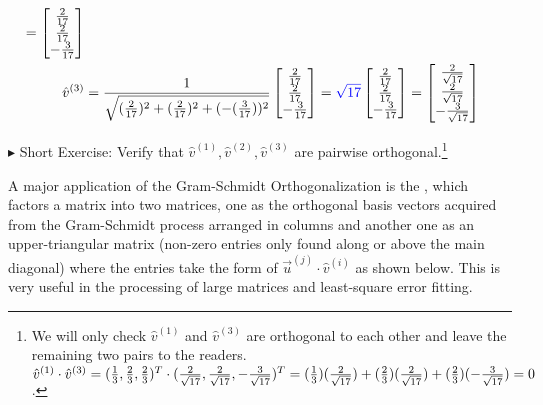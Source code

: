 \begin{solution}
\begin{align*}
=
\begin{bmatrix}
\frac{2}{17} \\
\frac{2}{17} \\
-\frac{3}{17}
\end{bmatrix}
\\
\hat{v}^{(3)} &= \frac{1}{\sqrt{(\frac{2}{17})^2 + (\frac{2}{17})^2 + (-(\frac{3}{17}))^2}}
\begin{bmatrix}
\frac{2}{17} \\
\frac{2}{17} \\
-\frac{3}{17}
\end{bmatrix}
=
\textcolor{blue}{\sqrt{17}}
\begin{bmatrix}
\frac{2}{17} \\
\frac{2}{17} \\
-\frac{3}{17}
\end{bmatrix}
=
\begin{bmatrix}
\frac{2}{\sqrt{17}} \\
\frac{2}{\sqrt{17}} \\
-\frac{3}{\sqrt{17}}
\end{bmatrix}
\end{align*}
\end{solution}
$\blacktriangleright$ Short Exercise: Verify that $\hat{v}^{(1)}, \hat{v}^{(2)}, \hat{v}^{(3)}$ are pairwise orthogonal.\footnote{We will only check $\hat{v}^{(1)}$ and $\hat{v}^{(3)}$ are orthogonal to each other and leave the remaining two pairs to the readers. $\hat{v}^{(1)} \cdot \hat{v}^{(3)} = \smash{(\frac{1}{3}, \frac{2}{3}, \frac{2}{3})}^T \cdot \smash{(\frac{2}{\sqrt{17}}, \frac{2}{\sqrt{17}}, -\frac{3}{\sqrt{17}})}^T = \smash{(\frac{1}{3})(\frac{2}{\sqrt{17}})} + \smash{(\frac{2}{3})(\frac{2}{\sqrt{17}})} + \smash{(\frac{2}{3})(-\frac{3}{\sqrt{17}})} = 0$.} \par
A major application of the Gram-Schmidt Orthogonalization is the , which factors a matrix into two matrices, one as the orthogonal basis vectors acquired from the Gram-Schmidt process arranged in columns and another one as an upper-triangular matrix (non-zero entries only found along or above the main diagonal) where the entries take the form of $\vec{u}^{(j)} \cdot \hat{v}^{(i)}$ as shown below. This is very useful in the processing of large matrices and least-square error fitting.
